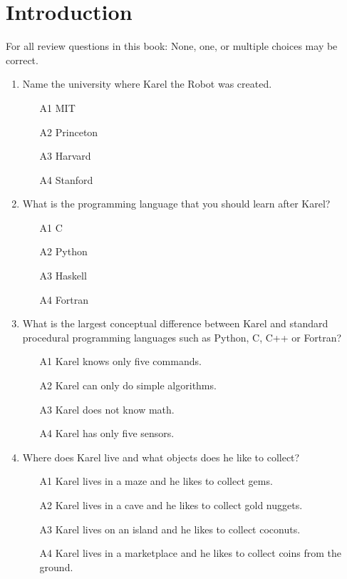 \section{Introduction}

For all review questions in this book: None, one, or multiple
choices may be correct.

\begin{enumerate}
\item Name the university where Karel the Robot was created.
\begin{enumerate}
\item[A1] MIT
\item[A2] Princeton
\item[A3] Harvard
\item[A4] Stanford
\end{enumerate}
\item What is the programming language that you should learn after Karel?
\begin{enumerate}
\item[A1] C
\item[A2] Python
\item[A3] Haskell
\item[A4] Fortran
\end{enumerate}
\item What is the largest conceptual difference between Karel and standard
      procedural programming languages such as Python, C, C++ or Fortran?
\begin{enumerate}
\item[A1] Karel knows only five commands.
\item[A2] Karel can only do simple algorithms.
\item[A3] Karel does not know math.
\item[A4] Karel has only five sensors.
\end{enumerate}
\item Where does Karel live and what objects does he like to collect?
\begin{enumerate}
\item[A1] Karel lives in a maze and he likes to collect gems.
\item[A2] Karel lives in a cave and he likes to collect gold nuggets.
\item[A3] Karel lives on an island and he likes to collect coconuts.
\item[A4] Karel lives in a marketplace and he likes to collect coins from the ground.
\end{enumerate}

\end{enumerate}
